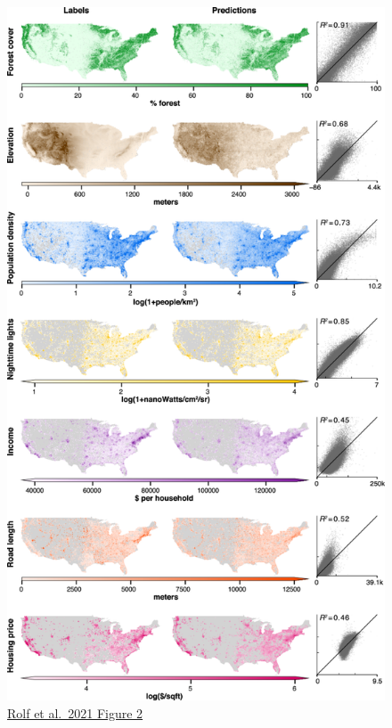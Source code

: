 \documentclass[
  letterpaper,
  DIV=11,
  numbers=noendperiod]{scrreprt}
\begin{document}
\begin{figure}

{\centering \includegraphics{images/rolf_et_al_2021-Fig_2.png}

}

\caption{\href{https://www.nature.com/articles/s41467-021-24638-z/figures/2}{Rolf
et al.~2021 Figure 2}}

\end{figure}
\end{document}
